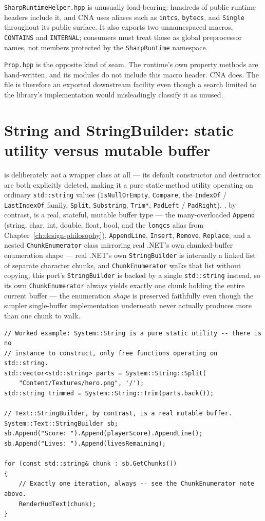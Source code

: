 \texttt{SharpRuntimeHelper.hpp} is unusually load-bearing: hundreds of public runtime headers
include it, and CNA uses aliases such as \texttt{intcs}, \texttt{bytecs}, and
\texttt{Single} throughout its public surface. It also exports two unnamespaced macros,
\texttt{CONTAINS} and \texttt{INTERNAL}; consumers must treat those as global preprocessor
names, not members protected by the \texttt{SharpRuntime} namespace.

\texttt{Prop.hpp} is the opposite kind of seam. The runtime's own property methods are
hand-written, and its modules do not include this macro header. CNA does. The file is therefore
an exported downstream facility even though a search limited to the library's implementation
would misleadingly classify it as unused.

\section{String and StringBuilder: static utility versus mutable buffer}

 is deliberately \emph{not} a wrapper class at all --- its default
constructor and destructor are both explicitly deleted, making it a pure static-method utility
operating on ordinary \texttt{std::string} values (\texttt{IsNullOrEmpty}, \texttt{Compare},
the \texttt{IndexOf} / \texttt{LastIndexOf} family, \texttt{Split}, \texttt{Substring},
\texttt{Trim*}, \texttt{PadLeft} / \texttt{PadRight}). , by
contrast, is a real, stateful, mutable buffer type --- the many-overloaded \texttt{Append}
(string, char, int, double, float, bool, and the \texttt{longcs} alias from
Chapter~\ref{ch:design-philosophy}), \texttt{AppendLine}, \texttt{Insert},
\texttt{Remove}, \texttt{Replace}, and a nested \texttt{ChunkEnumerator} class mirroring real
.NET's own chunked-buffer enumeration shape --- real .NET's own \texttt{StringBuilder} is
internally a linked list of separate character chunks, and \texttt{ChunkEnumerator} walks that
list without copying; this port's \texttt{StringBuilder} is backed by a single
\texttt{std::string} instead, so its own \texttt{ChunkEnumerator} always yields exactly one
chunk holding the entire current buffer --- the enumeration \emph{shape} is preserved
faithfully even though the simpler single-buffer implementation underneath never actually
produces more than one chunk to walk.

\begin{lstlisting}
// Worked example: System::String is a pure static utility -- there is no
// instance to construct, only free functions operating on std::string.
std::vector<std::string> parts = System::String::Split(
    "Content/Textures/hero.png", '/');
std::string trimmed = System::String::Trim(parts.back());

// Text::StringBuilder, by contrast, is a real mutable buffer.
System::Text::StringBuilder sb;
sb.Append("Score: ").Append(playerScore).AppendLine();
sb.Append("Lives: ").Append(livesRemaining);

for (const std::string& chunk : sb.GetChunks())
{
    // Exactly one iteration, always -- see the ChunkEnumerator note above.
    RenderHudText(chunk);
}
\end{lstlisting}

